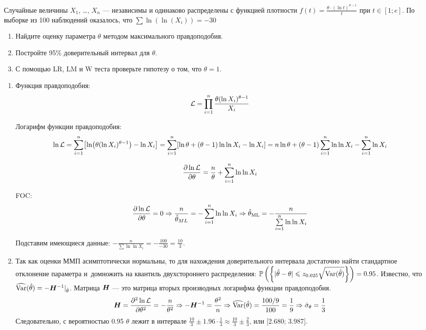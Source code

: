 \begin{problem}
Случайные величины $X_{1}$, \ldots, $X_{n}$ — независимы и одинаково распределены с функцией плотности $f(t)=\frac{\theta \cdot\left(\ln  t\right)^{\theta -1}}{t} $  при  $t\in
\left[1;e\right]$. По выборке из 100 наблюдений оказалось, что $\sum{\ln(\ln(X_{i}))}=-30$
\begin{enumerate}
\item Найдите оценку параметра $\theta$ методом максимального правдоподобия.
\item Постройте 95\% доверительный интервал для $\theta$.
\item С помощью LR, LM и W теста проверьте гипотезу о том, что $\theta=1$.
\end{enumerate}



\begin{sol}
  \begin{enumerate}

\item Функция правдоподобия:
\[
\mathcal{L} = \prod_{i=1}^{n} \frac{\theta (\ln X_i)^{\theta-1}}{X_i}
\]

Логарифм функции правдоподобия:
\[
\ln \calL = \sum\limits_{i=1}^{n} \bigl[\ln \bigl(\theta (\ln X_i)^{\theta-1} \bigr) - \ln X_i \bigr]
= \sum\limits_{i=1}^{n} [\ln \theta + (\theta-1) \ln\ln X_i - \ln X_i] \hm
= n \ln \theta + (\theta-1) \sum\limits_{i=1}^{n} \ln \ln X_i - \sum\limits_{i=1}^{n} \ln X_i
\]


\[\frac{\partial \ln \mathcal{L}}{\partial \theta} = \frac{n}{\theta} + \sum\limits_{i=1}^{n} \ln \ln X_i \]

FOC: \[\frac{\partial \ln \mathcal{L}}{\partial \theta} = 0 \Rightarrow \frac{n}{\hat{\theta}_{ML}} = -\sum\limits_{i=1}^{n} \ln \ln X_i \Rightarrow \hat\theta_{\text{ML}} = - \frac{n}{\sum\limits_{i=1}^{n} \ln \ln X_i} \]

Подставим имеющиеся данные: $- \frac{n}{\sum \ln \ln X_i} = -\frac{100}{-30} = \frac{10}{3}$.



\item Так как оценки ММП асимптотически нормальны, то для нахождения доверительного интервала достаточно найти стандартное отклонение параметра  и~домножить на квантиль двухстороннего распределения: $\mathbb{P}\left(\left\{|\hat\theta-\theta| \leqslant z_{0.025} \sqrt{\operatorname{Var}(\hat\theta)}\right\}\right) = 0.95$. Известно, что $\widehat{\operatorname{Var}}(\hat \theta) = -\boldsymbol{H}^{-1} |_{\hat\theta}$. Матрица $\boldsymbol{H}$ — это матрица вторых производных логарифма функции правдоподобия.
\[
\boldsymbol{H} = \frac{\partial^2 \ln \mathcal{L}}{\partial \theta^2} = -\frac{n}{\theta^2} \Rightarrow -\boldsymbol{H}^{-1} = \frac{\theta^2}{n} \Rightarrow \widehat{\operatorname{Var}}(\hat\theta) = \frac{100/9}{100} = \frac19 \Rightarrow \hat\sigma_{\theta} = \frac13
\]
Следовательно, с вероятностью 0.95 $\theta$ лежит в интервале $\frac{10}{3} \pm 1.96 \cdot \frac{1}{3} \approx \frac{10}{3} \pm \frac{2}{3}$, или [2.680; 3.987].




\end{enumerate}
\end{sol}
\end{problem}
